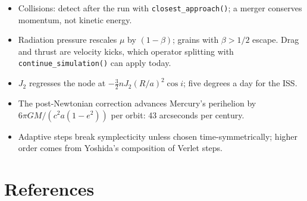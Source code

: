 \documentclass[
  10.5pt,
  letterpaper,
]{scrbook}
\providecommand{\tightlist}{%
  \setlength{\itemsep}{0pt}\setlength{\parskip}{0pt}}
\theoremstyle{plain}
\theoremstyle{remark}
\begin{document}
\begin{tcolorbox}[enhanced jigsaw, arc=.35mm, bottomrule=.15mm, bottomtitle=1mm, breakable, colback=white, colbacktitle=quarto-callout-tip-color!10!white, colframe=quarto-callout-tip-color-frame, coltitle=black, left=2mm, leftrule=.75mm, opacityback=0, opacitybacktitle=0.6, rightrule=.15mm, title={Key results}, titlerule=0mm, toprule=.15mm, toptitle=1mm]

\begin{itemize}
\tightlist
\item
  Collisions: detect after the run with \texttt{closest\_approach()}; a
  merger conserves momentum, not kinetic energy.
\item
  Radiation pressure rescales \(\mu\) by \((1-\beta)\); grains with
  \(\beta > 1/2\) escape. Drag and thrust are velocity kicks, which
  operator splitting with \texttt{continue\_simulation()} can apply
  today.
\item
  \(J_2\) regresses the node at \(-\tfrac32 n J_2 (R/a)^2\cos i\); five
  degrees a day for the ISS.
\item
  The post-Newtonian correction advances Mercury's perihelion by
  \(6\pi GM/(c^2 a(1-e^2))\) per orbit: 43 arcseconds per century.
\item
  Adaptive steps break symplecticity unless chosen time-symmetrically;
  higher order comes from Yoshida's composition of Verlet steps.
\end{itemize}

\end{tcolorbox}


\chapter*{References}\label{references}

\end{document}
